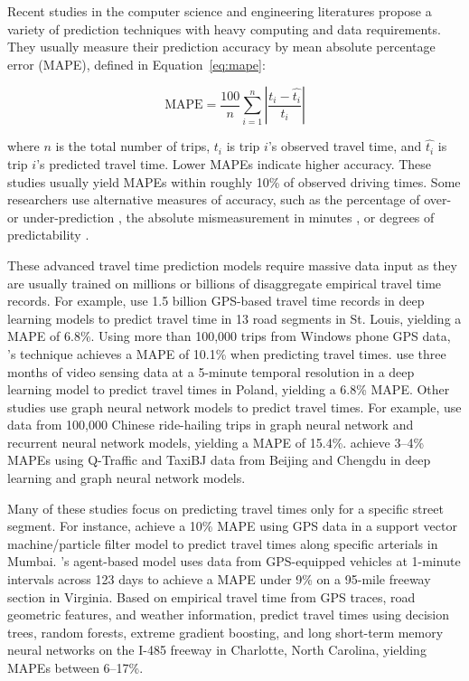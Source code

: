 \documentclass[12pt,letterpaper]{article} %
\begin{document}
    Recent studies in the computer science and engineering literatures propose a variety of prediction techniques with heavy computing and data requirements. They usually measure their prediction accuracy by mean absolute percentage error (MAPE), defined in Equation~\ref{eq:mape}:

    \begin{equation}
        \label{eq:mape}
        \text{MAPE} = \frac{100}{n} \sum^{n}_{i=1} \left|\frac{t_i - \hat{t_i}}{t_i}\right|
    \end{equation}

    where $n$ is the total number of trips, $t_i$ is trip $i$'s observed travel time, and $\hat{t_i}$ is trip $i$'s predicted travel time. Lower MAPEs indicate higher accuracy.  These studies usually yield MAPEs within roughly 10\% of observed driving times. Some researchers use alternative measures of accuracy, such as the percentage of over- or under-prediction \citep{jenelius2013travel}, the absolute mismeasurement in minutes \citep{chiabaut2021traffic}, or degrees of predictability \citep{li2019travel}.

    These advanced travel time prediction models require massive data input as they are usually trained on millions or billions of disaggregate empirical travel time records. For example, \citet{hou2018network} use 1.5 billion GPS-based travel time records in deep learning models to predict travel time in 13 road segments in St. Louis, yielding a MAPE of 6.8\%. Using more than 100,000 trips from Windows phone GPS data, \citet{woodard2017predicting}'s technique achieves a MAPE of 10.1\% when predicting travel times. \citet{pamula2023estimation} use three months of video sensing data at a 5-minute temporal resolution in a deep learning model to predict travel times in Poland, yielding a 6.8\% MAPE. Other studies use graph neural network models to predict travel times. For example, \citet{wang2023dynamic} use data from 100,000 Chinese ride-hailing trips in graph neural network and recurrent neural network models, yielding a MAPE of 15.4\%. \citet{vankdoth2023deep} achieve 3--4\% MAPEs using Q-Traffic and TaxiBJ data from Beijing and Chengdu in deep learning and graph neural network models.

    Many of these studies focus on predicting travel times only for a specific street segment. For instance, \citet{sharmila2019svm} achieve a 10\% MAPE using GPS data in a support vector machine/particle filter model to predict travel times along specific arterials in Mumbai. \citet{chen2016multi}'s agent-based model uses data from GPS-equipped vehicles at 1-minute intervals across 123 days to achieve a MAPE under 9\% on a 95-mile freeway section in Virginia. Based on empirical travel time from GPS traces, road geometric features, and weather information, \citet{qiu2021machine} predict travel times using decision trees, random forests, extreme gradient boosting, and long short-term memory neural networks on the I-485 freeway in Charlotte, North Carolina, yielding MAPEs between 6--17\%.
\end{document}
